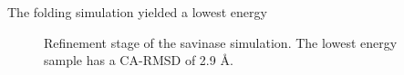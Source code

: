 The folding simulation yielded a lowest energy 





\begin{figure}%
    \centering
    \caption{Refinement stage of the savinase simulation. The lowest energy sample has a CA-RMSD of 2.9 \AA. }
    \label{fig:savinase_fold}%
\end{figure}


% 
% 

